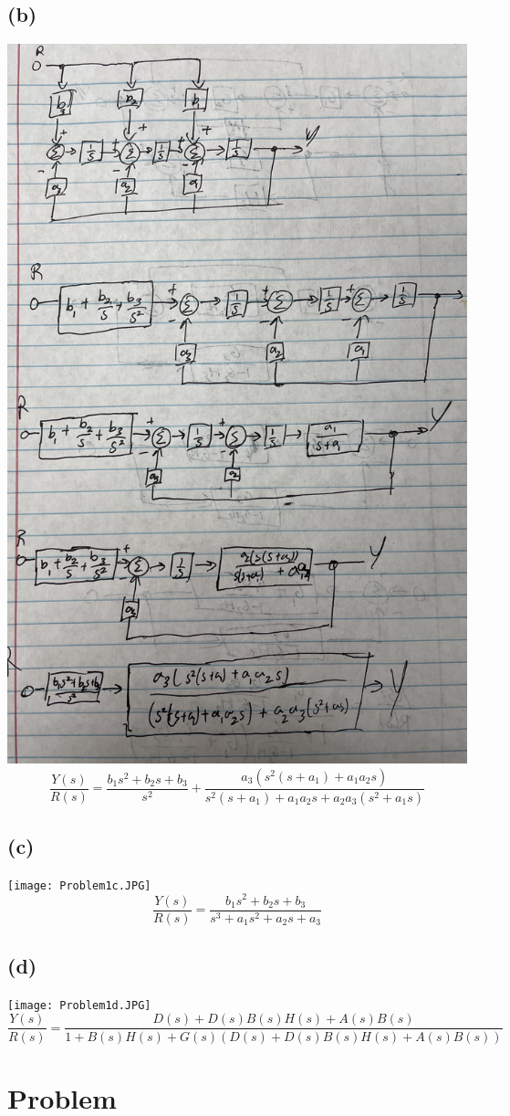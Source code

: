 \documentclass[12pt]{article}
\begin{document}
\subsection*{(b)}
\includegraphics[scale=0.5]{Problem1b.JPG}
\FloatBarrier
$$\frac{Y(s)}{R(s)}=\boxed{\frac{b_1s^2+b_2s+b_3}{s^2}+
\frac{a_3(s^2(s+a_1)+a_1a_2s)}{s^2(s+a_1)+a_1a_2s+a_2a_3(s^2+a_1s)}}$$

\subsection*{(c)}
\texttt{[image: Problem1c.JPG]}
\FloatBarrier
$$\frac{Y(s)}{R(s)}=\boxed{\frac{b_1s^2+b_2s+b_3}{s^3+a_1s^2+a_2s+a_3}}$$
\subsection*{(d)}
\texttt{[image: Problem1d.JPG]}
\FloatBarrier
$$\frac{Y(s)}{R(s)}=\boxed{\frac{D(s)+D(s)B(s)H(s)+A(s)B(s)}
{1+B(s)H(s)+G(s)(D(s)+D(s)B(s)H(s)+A(s)B(s))}}$$
\section*{Problem }
\end{document}
